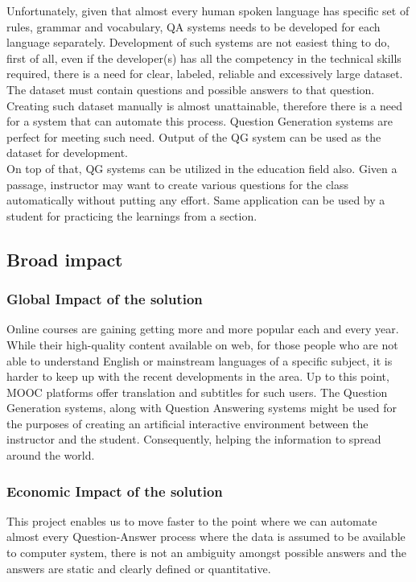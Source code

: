 \documentclass{mefsdp}
\begin{document}
	Unfortunately, given that almost every human spoken language has specific set of rules, grammar and vocabulary, QA systems needs to be developed for each language separately. Development of such systems are not easiest thing to do, first of all, even if the developer(s) has all the competency in the technical skills required, there is a need for clear, labeled, reliable and excessively large dataset. The dataset must contain questions and possible answers to that question. Creating such dataset manually is almost unattainable, therefore there is a need for a system that can automate this process. Question Generation systems are perfect for meeting such need. Output of the QG system can be used as the dataset for development.\\
	
	On top of that, QG systems can be utilized in the education field also. Given a passage, instructor may want to create various questions for the class automatically without putting any effort. Same application can be used by a student for practicing the learnings from a section.

	
	\subsection{Broad impact}
	\subsubsection{Global Impact of the solution}
	Online courses are gaining getting more and more popular each and every year. While their high-quality content available on web, for those people who are not able to understand English or mainstream languages of a specific subject, it is harder to keep up with the recent developments in the area. Up to this point, MOOC platforms offer translation and subtitles for such users. The Question Generation systems, along with Question Answering systems might be used for the purposes of creating an artificial interactive environment between the instructor and the student. Consequently, helping the information to spread around the world.
	
	\subsubsection{Economic Impact of the solution}
	This project enables us to move faster to the point where we can automate almost every Question-Answer process where the data is assumed to be available to computer system, there is not an ambiguity amongst possible answers and the answers are static and clearly defined or quantitative.\\
	
\end{document}
